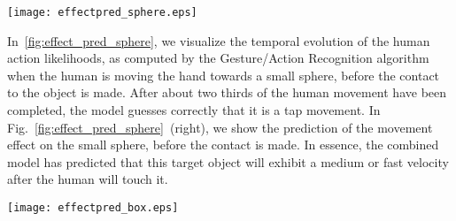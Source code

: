 \begin{figure*}
  \quad
  \texttt{[image: effectpred\_sphere.eps]}
  \caption{Object velocity predictions on a small sphere, given probabilistic human action information from Gesture \acp{HMM}.}
  \label{fig:effect_pred_sphere}
\end{figure*}

In~\ref{fig:effect_pred_sphere}, we visualize the temporal evolution of the human action likelihoods, as computed by the Gesture/Action Recognition algorithm when the human is moving the hand towards a small sphere, before the contact to the object is made.
After about two thirds of the human movement have been completed, the model guesses correctly that it is a tap movement.
In Fig.~\ref{fig:effect_pred_sphere}~(right), we show the prediction of the movement effect on the small sphere, before the contact is made.
In essence, the combined model has predicted that this target object will exhibit a medium or fast velocity after the human will touch it.

\begin{figure*}
  \quad
  \texttt{[image: effectpred\_box.eps]}
  \caption{Object velocity predictions on a big box, given probabilistic human action information from Gesture \acp{HMM}.}
  \label{fig:effect_pred_box}
\end{figure*}

